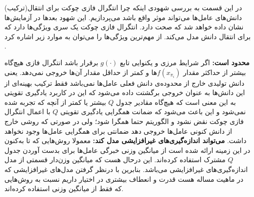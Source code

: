 در این قسمت به بررسی شهودی اینکه چرا انتگرال فازی چوکت برای انتقال(ترکیب) دانش‌های عامل‌ها می‌تواند موثر واقع باشد می‌پردازیم. این شهود بعدها در آزمایش‌ها نشان داده خواهد شد که صحت دارد. انتگرال فازی چوکت یک سری ویژگی‌ها دارد که برای انتقال دانش مدل می‌کند. از مهم‌ترین ویژگی‌ها را می‌توان به موارد زیر اشاره کرد .
\begin{enumerate}
 \textbf{محدود است:} اگر شرایط مرزی و یکنوایی تابع $g(\cdot)$ برقرار باشد انتگرال‌ فازی هیچ‌گاه بیشتر از حداکثر مقدار $f(x_{\pi_i})$ها و کمتر از حداقل مقدار آن‌ها خروجی نمی‌دهد. یعنی دانش تولیدی خارج از محدوده‌ی دانش فعلی عامل‌ها نمی‌باشد فقط ترکیب بهینه‌ای از این دانش‌ها به عنوان خروجی برگشتت داده می‌شود که این در کاربرد یادگیری تقویتی به این معنی است که هیچ‌گاه مقادیر جدول $Q$ بیشتر یا کمتر از آنچه که تجربه شده نمی‌شود و این باعث می‌شود که ضمانت همگرایی یادگیری تقویتی $Q$ با اعمال انتگرال فازی چوکت نقض نشود و الگوریتم حتما همگرا شود؛ ولی در صورتی که روشی خارج از دانش کنونی عامل‌ها خروجی دهد ضمانتی برای همگرایی عامل‌ها وجود نخواهد داشت.
 \textbf{می‌تواند اندازه‌گیری‌های غیرافزایشی مدل کند:} معمولا روش‌هایی که تا به‌کنون در این زمینه ارائه شده است از میانگین وزنی خبرگی عامل‌ها برای بدست آوردن جدول $Q$ مشترک استفاده کرده‌اند. این درحال هست که میانگین وزن‌دار قسمتی از مدل اندازه‌گیری‌های غیرافزایشی می‌باشد. بنابرین با درنظر گرفتن مدل‌های غیرافزایشی که در ماهیت مساله هست قدرت و انعطاف بیشتری در اختیار داریم نسبت به روش‌هایی که فقط از میانگین وزنی استفاده کرده‌اند.
\end{enumerate}

\begin{definition}\setstretch{\thebaselinestretch}\label{non_additive_definition}

\end{definition}